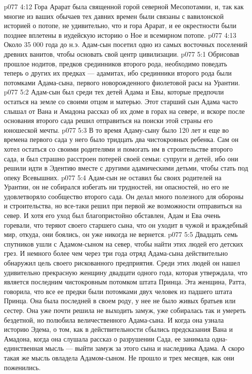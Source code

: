 \vs p077 4:12 Гора Арарат была священной горой северной Месопотамии, и, так как многие из ваших обычаев тех давних времен были связаны с вавилонской историей о потопе, не удивительно, что и гора Арарат, и ее окрестности были позднее вплетены в иудейскую историю о Ное и всемирном потопе.
\vs p077 4:13 Около 35 000 года до н.э. Адам\hyp{}сын посетил одно из самых восточных поселений древних ванитов, чтобы основать свой центр цивилизации.
\vs p077 5:1 Обрисовав прошлое нодитов, предков срединников второго рода, необходимо поведать теперь о других их предках --- адамитах, ибо срединники второго рода были потомками Адама\hyp{}сына, первого новорожденного фиолетовой расы на Урантии.
\vs p077 5:2 \pc Адам\hyp{}сын был среди тех детей Адама и Евы, которые предпочли остаться на земле со своими отцом и матерью. Этот старший сын Адама часто слышал от Вана и Амадона рассказ об их доме в горах на севере, и вскоре после основания второго сада решил отправиться на поиски этой страны его юношеской мечты.
\vs p077 5:3 В то время Адаму\hyp{}сыну было 120 лет и еще во времена первого сада у него было тридцать два чистокровных ребенка. Сам он хотел остаться со своими родителями и помогать им в строительстве второго сада, и был страшно расстроен потерей своей семьи: супруги и детей, ибо они решили идти в Эдентию вместе с другими адамическими детьми, чтобы стать под опеку Всевышних.
\vs p077 5:4 Адам\hyp{}сын не оставил бы своих родителей на Урантии, он не собирался избегать ни трудностей, ни опасностей, но его не удовлетворяло сообщество второго сада. Он делал много полезного для обороны и строительства, но все\hyp{}таки решил при первой же возможности отправиться на север. И хотя его уход был благопристойно обставлен, Адам и Ева очень горевали, что теряют своего старшего сына, что он уходит в чужой и враждебный мир, откуда, они боялись, он уже никогда не вернется.
\vs p077 5:5 Двадцать семь спутников ушли с Адамом\hyp{}сыном на север, чтобы найти этих людей его детских грез. И немного более чем через три года отряд Адама\hyp{}сына действительно обнаружил цель своего рискованного предприятия. Среди этих людей он нашел удивительно прекрасную женщину двадцати одного года, которая утверждала, что является последним чистокровным потомком штата Принца. Эта женщина, Ратта, говорила, что все ее предки были потомками двух человек из падшего штата Принца. Она была последней в своем роду, у нее не было живых братьев или сестер. Она уже почти решила не выходить замуж, уже собиралась так и умереть бездетной, но полюбила величественного Адама\hyp{}сына. И когда она узнала историю Эдема, о том, как в действительности сбылись предсказания Вана и Амадона, когда она слушала рассказ о разрушении Сада, ее занимала одна\hyp{}единственная мысль --- выйти замуж за этого сына и наследника Адама. А скоро такая же мысль овладела Адамом\hyp{}сыном. Не прошло и трех месяцев, как они поженились.
